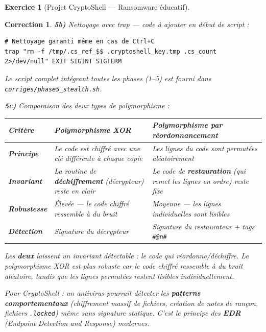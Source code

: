 \documentclass[a4paper,11pt]{article}
\theoremstyle{plain}
\newtheorem{correction}{Correction}
\theoremstyle{definition}
\newtheorem{exercice}{Exercice}
\begin{document}
\begin{exercice}[Projet CryptoShell --- Ransomware éducatif]
\begin{correction}
\textbf{5b)} Nettoyage avec trap --- code à ajouter en début de script :
\begin{lstlisting}[title=Nettoyage avec trap (5b)]
# Nettoyage garanti même en cas de Ctrl+C
trap "rm -f /tmp/.cs_ref_$$ .cryptoshell_key.tmp .cs_count 2>/dev/null" EXIT SIGINT SIGTERM
\end{lstlisting}

Le script complet intégrant toutes les phases (1--5) est fourni dans \texttt{corriges/phase5\_stealth.sh}.

\medskip
\textbf{5c)} Comparaison des deux types de polymorphisme :

\begin{center}
\begin{tabular}{lp{5cm}p{5cm}}
\toprule
\textbf{Critère} & \textbf{Polymorphisme XOR} & \textbf{Polymorphisme par réordonnancement} \\
\midrule
\textbf{Principe} & Le code est chiffré avec une clé différente à chaque copie & Les lignes du code sont permutées aléatoirement \\
\textbf{Invariant} & La routine de \textbf{déchiffrement} (décrypteur) reste en clair & Le code de \textbf{restauration} (qui remet les lignes en ordre) reste fixe \\
\textbf{Robustesse} & Élevée --- le code chiffré ressemble à du bruit & Moyenne --- les lignes individuelles sont lisibles \\
\textbf{Détection} & Signature du décrypteur & Signature du restaurateur + tags \texttt{\#@n\#} \\
\bottomrule
\end{tabular}
\end{center}

Les \textbf{deux} laissent un invariant détectable : le code qui réordonne/déchiffre. Le polymorphisme XOR est plus robuste car le code chiffré ressemble à du bruit aléatoire, tandis que les lignes permutées restent lisibles individuellement.

Pour CryptoShell : un antivirus pourrait détecter les \textbf{patterns comportementaux} (chiffrement massif de fichiers, création de notes de rançon, fichiers \texttt{.locked}) même sans signature statique. C'est le principe des \textbf{EDR} (\textit{Endpoint Detection and Response}) modernes.


\end{correction}
\end{exercice}
\end{document}
